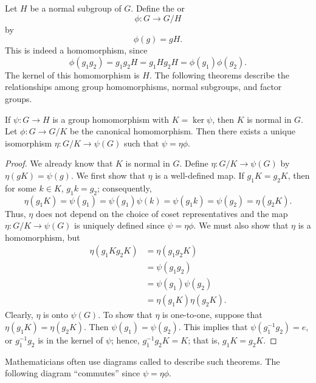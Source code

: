 Let $H$ be a normal subgroup of $G$. Define the  or   
\[
\phi : G \rightarrow G/H
\]
by
\[
\phi(g) = gH.
\]
This is indeed a homomorphism, since
\[
\phi( g_1 g_2 ) = g_1 g_2 H =  g_1 H g_2 H = \phi( g_1) \phi( g_2 ). 
\]
The kernel of this homomorphism is $H$.	 The following theorems 
describe the relationships among group homomorphisms, normal 
subgroups, and factor groups. 
 
 
\begin{theorem}\label{FirstIsoTheorem}
If $\psi : G \rightarrow H$ is a group homomorphism with $K =\ker
\psi$, then $K$ is normal in $G$. Let $\phi: G \rightarrow G/K$ be
the canonical homomorphism.  Then there exists a unique isomorphism
$\eta: G/K \rightarrow \psi(G)$ such that $\psi =  \eta \phi$.
\end{theorem}
 
 
\begin{proof}
We already know that $K$ is normal in $G$. Define $\eta: G/K
\rightarrow \psi(G)$ by $\eta(gK) = \psi(g)$.  We first show that
$\eta$ is a well-defined map.  If $g_1 K =g_2 K$, then for some $k \in
K$, $g_1 k=g_2$; consequently, 
\[
\eta(g_1 K) = \psi(g_1) = \psi(g_1) \psi(k) = \psi(g_1k) = \psi(g_2)
= \eta(g_2 K). 
\]
Thus, $\eta$ does not depend on the choice of coset representatives and the map $\eta: G/K \rightarrow \psi(G)$  is uniquely defined since $\psi =  \eta \phi$.
We must also
show that $\eta$ is a homomorphism, but 
\begin{align*}
\eta( g_1K g_2K ) & = \eta(g_1 g_2K) \\
& = \psi(g_1 g_2) \\
& = \psi(g_1) \psi(g_2) \\
& = \eta( g_1K) \eta( g_2K ).
\end{align*}
Clearly, $\eta$ is onto $\psi( G)$. 
To show that $\eta$ is one-to-one, suppose that $\eta(g_1 K) = 
\eta(g_2 K)$. Then $\psi(g_1) = \psi(g_2)$. This implies that 
$\psi( g_1^{-1} g_2 ) = e$, or $g_1^{-1} g_2$ is in the kernel of $\psi$; 
hence, $g_1^{-1} g_2K = K$; that is, $g_1K =g_2K$.  
\end{proof}
 
 
\medskip
 
 
Mathematicians often use diagrams called  to describe such theorems. The
following diagram ``commutes'' since $\psi = \eta \phi$. 



